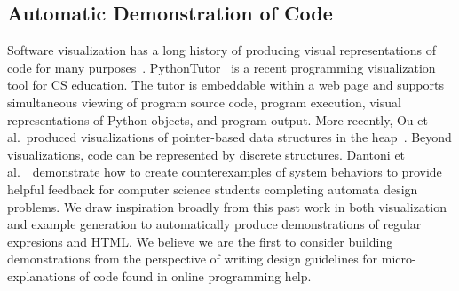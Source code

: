 \subsection{Automatic Demonstration of Code}

Software visualization has a long history of producing visual representations of code for many purposes~\cite{sorva_visual_2012}.
PythonTutor~\cite{guo_online_2013} is a recent programming visualization tool for CS education.
The tutor is embeddable within a web page and supports simultaneous viewing of program source code, program execution, visual representations of Python objects, and program output.
More recently, Ou et al.\ produced visualizations of pointer-based data structures in the heap~\cite{ou_interactive_2015}.
Beyond visualizations, code can be represented by discrete structures.
Dantoni et al.~\cite{dantoni_how_2015}\ demonstrate how to create counterexamples of system behaviors to provide helpful feedback for computer science students completing automata design problems.
We draw inspiration broadly from this past work in both visualization and example generation to automatically produce demonstrations of regular expresions and HTML\@.
We believe we are the first to consider building demonstrations from the perspective of writing design guidelines for micro-explanations of code found in online programming help.
